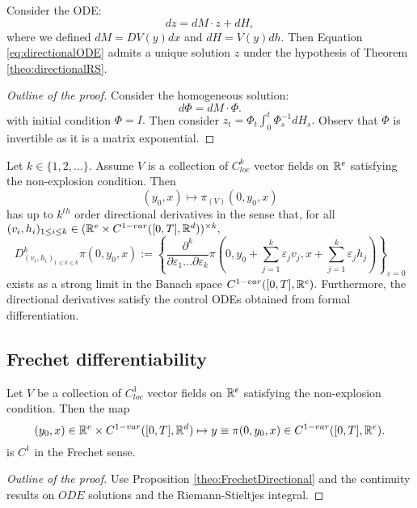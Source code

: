 \begin{proposition}
    Consider the ODE:
    \begin{equation}\label{eq:directionalODE}
        dz = dM \cdot z + dH, 
    \end{equation}
    where we defined $dM = DV(y) dx$ and $dH = V(y) dh.$
    Then Equation \eqref{eq:directionalODE} admits a unique solution $z$ under the hypothesis of Theorem \ref{theo:directionalRS}.
\end{proposition}
\begin{proof}[Outline of the proof]
    Consider the homogeneous solution:
    \begin{equation}
        d \Phi = dM \cdot \Phi.
    \end{equation}
    with initial condition $\Phi = I.$
    Then consider $z_t = \Phi_t \int_0^t \Phi_s^{-1} dH_s.$
    Observ that $\Phi$ is invertible as it is a matrix exponential.
\end{proof}

\begin{proposition}
    Let $k \in \{ 1, 2, \ldots \}.$
    Assume $V$ is a collection of $C^k_{loc}$ vector fields on $\mathbb{R}^e$ satisfying the non-explosion condition. Then
    \begin{equation*}
        (y_0, x) \mapsto \pi_{(V)}(0, y_0, x)
    \end{equation*}
    has up to $k^{th}$ order directional derivatives in the sense that, for all $(v_i, h_i)_{1 \leq i \leq k} \in (\mathbb{R}^e \times C^{1-var}([0,T], \mathbb{R}^d))^{\times k},$
    \begin{equation*}
        D_{(v_i, h_i)_{1 \leq k \leq k}}^k \pi(0, y_0, x) := \left\{ \frac{\partial^k}{\partial \varepsilon_1 \ldots \partial \varepsilon_k} \pi \left( 0, y_0 + \sum_{j=1}^k \varepsilon_j v_j, x + \sum_{j=1}^k \varepsilon_j h_j \right) \right\}_{\varepsilon = 0}
    \end{equation*}
    exists as a strong limit in the Banach space $C^{1-var}([0,T], \mathbb{R}^e).$
    Furthermore, the directional derivatives satisfy the control ODEs obtained from formal differentiation.
\end{proposition}

\subsection{Frechet differentiability}

\begin{theorem}
    Let $V$ be a collection of $C^1_{loc}$ vector fields on $\mathbb{R}^e$ satisfying the non-explosion condition. Then the map
    \begin{equation}
        (y_0, x) \in \mathbb{R}^e \times C^{1-var}([0,T], \mathbb{R}^d) \mapsto y \equiv \pi(0, y_0, x) \in C^{1-var}([0,T], \mathbb{R}^e).
    \end{equation}
    is $C^1$ in the Frechet sense.
\end{theorem}
\begin{proof}[Outline of the proof]
    Use Proposition \ref{theo:FrechetDirectional} and the continuity results on $ODE$ solutions and the Riemann-Stieltjes integral.
\end{proof}

